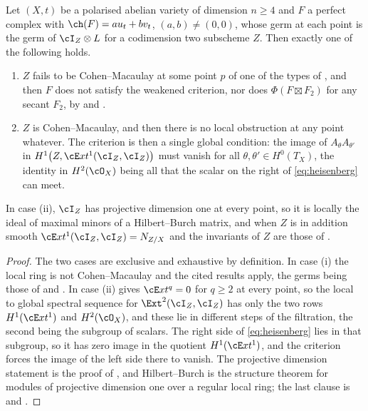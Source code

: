 \begin{corollary}%
\label{cor:cmdichotomy}
Let $(X,t)$ be a polarised abelian variety of dimension $n\ge4$ and $F$ a
perfect complex with $\ch(F)=au_{t}+bv_{t}$, $(a,b)\ne(0,0)$, whose germ at
each point is the germ of $\cI_{Z}\otimes L$ for a codimension two subscheme
$Z$. Then exactly one of the following holds.
\begin{enumerate}[label=\textup{(\roman*)},leftmargin=2.6em]
\item $Z$ fails to be Cohen--Macaulay at some point $p$ of one of the types of
  , and then $F$ does not satisfy the weakened criterion,
  nor does $\Phi(F\boxtimes F_{2})$ for any secant $F_{2}$, by
   and .
\item $Z$ is Cohen--Macaulay, and then there is no local obstruction at any
  point whatever. The criterion is then a single global condition: the image
  of $A_{\theta}A_{\theta'}$ in $H^{1}\bigl(Z,\cE xt^{1}(\cI_{Z},\cI_{Z})\bigr)$
  must vanish for all $\theta,\theta'\in H^{0}(T_{X})$, the identity in
  $H^{2}(\cO_{X})$ being all that the scalar on the right of
  \eqref{eq:heisenberg} can meet.
\end{enumerate}
In case (ii), $\cI_{Z}$ has projective dimension one at every point, so it is
locally the ideal of maximal minors of a Hilbert--Burch matrix, and when $Z$
is in addition smooth $\cE xt^{1}(\cI_{Z},\cI_{Z})=N_{Z/X}$ and the invariants
of $Z$ are those of .
\end{corollary}

\begin{proof}
The two cases are exclusive and exhaustive by definition. In case (i) the
local ring is not Cohen--Macaulay and the cited results apply, the germs being
those of  and . In case
(ii)  gives $\cE xt^{q}=0$ for $q\ge2$ at every point, so
the local to global spectral sequence for $\Ext^{2}(\cI_{Z},\cI_{Z})$ has only
the two rows $H^{1}(\cE xt^{1})$ and $H^{2}(\cO_{X})$, and these lie in
different steps of the filtration, the second being the subgroup of scalars.
The right side of \eqref{eq:heisenberg} lies in that subgroup, so it has zero
image in the quotient $H^{1}(\cE xt^{1})$, and the criterion forces the image
of the left side there to vanish. The projective dimension statement is the
proof of , and Hilbert--Burch is the structure theorem
for modules of projective dimension one over a regular local ring; the last
clause is  and .
\end{proof}

